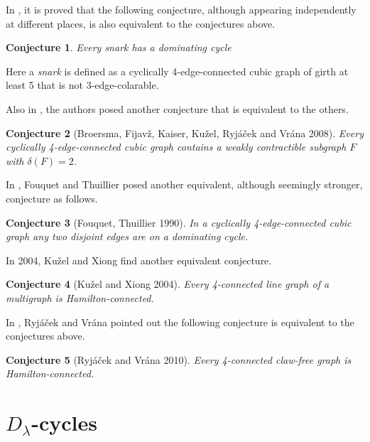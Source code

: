 \documentclass[12pt]{report}
\newtheorem{conjecture}{Conjecture}
\begin{document}
In \cite{broersma2008contractible}, it is proved that the following conjecture, although appearing independently at different places, is also equivalent to the conjectures above.

\begin{conjecture}
Every snark has a dominating cycle
\end{conjecture}
Here a {\em snark} is defined as a cyclically 4-edge-connected cubic graph of girth at least 5 that is not 3-edge-colarable.


Also in \cite{broersma2008contractible}, the authors posed another conjecture that is equivalent to the others.

\begin{conjecture}[Broersma, Fijav{\v{z}}, Kaiser, Ku{\v{z}}el, Ryj{\'{a}}{\v{c}}ek and Vr{\'{a}}na 2008]\label{bfkkrv}
Every cyclically 4-edge-connected cubic graph contains a weakly contractible subgraph $F$ with $\delta(F)=2$.
\end{conjecture}


In \cite{fouquet1990some}, Fouquet and Thuillier posed another equivalent, although seemingly stronger, conjecture as follows.

\begin{conjecture}[Fouquet, Thuillier 1990]\label{fouthui}
In a cyclically 4-edge-connected cubic graph any two disjoint edges are on a dominating cycle.

\end{conjecture}


In 2004, Ku{\v{z}}el and Xiong find another equivalent conjecture.

\begin{conjecture}[Ku{\v{z}}el and Xiong 2004]\label{kuxio}
Every 4-connected line graph of a multigraph is Hamilton-connected.
\end{conjecture}

In \cite{ryjavcek2011line}, Ryj{\'{a}}{\v{c}}ek and Vr{\'{a}}na pointed out the following conjecture is equivalent to the conjectures above.
\begin{conjecture}[Ryj{\'{a}}{\v{c}}ek and Vr{\'{a}}na 2010]\label{ryjvr}
Every 4-connected claw-free graph is Hamilton-connected.
\end{conjecture}







\section{$D_{\lambda}$-cycles}
\end{document}
